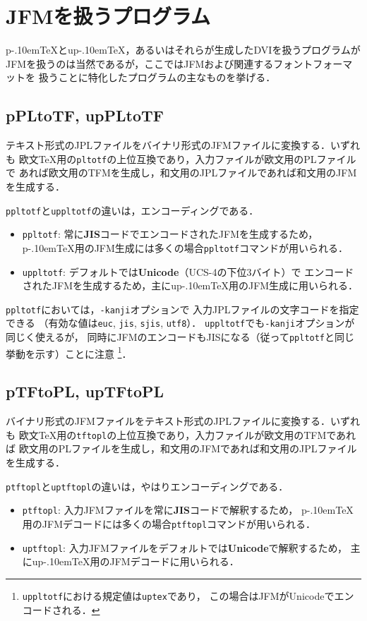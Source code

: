 \documentclass[a4paper,11pt,nomag]{jsarticle}
\def\code#1{\texttt{#1}}
\def\pTeX{p\kern-.10em\TeX}\def\upTeX{u\pTeX}
\begin{document}
\section{JFMを扱うプログラム}\label{jfm-program}

\pTeX と\upTeX ，あるいはそれらが生成したDVIを扱うプログラムが
JFMを扱うのは当然であるが，ここではJFMおよび関連するフォントフォーマットを
扱うことに特化したプログラムの主なものを挙げる．

\subsection{pPLtoTF, upPLtoTF}

テキスト形式のJPLファイルをバイナリ形式のJFMファイルに変換する．いずれも
欧文\TeX 用の\code{pltotf}の上位互換であり，入力ファイルが欧文用のPLファイルで
あれば欧文用のTFMを生成し，和文用のJPLファイルであれば和文用のJFMを生成する．

\code{ppltotf}と\code{uppltotf}の違いは，エンコーディングである．
\begin{itemize}
  \item \code{ppltotf}: 常に\textbf{JIS}コードでエンコードされたJFMを生成するため，
    \pTeX 用のJFM生成には多くの場合\code{ppltotf}コマンドが用いられる．
  \item \code{uppltotf}: デフォルトでは\textbf{Unicode}（UCS-4の下位3バイト）で
    エンコードされたJFMを生成するため，主に\upTeX 用のJFM生成に用いられる．
\end{itemize}

\code{ppltotf}においては，\code{-kanji}オプションで
入力JPLファイルの文字コードを指定できる
（有効な値は\code{euc}, \code{jis}, \code{sjis}, \code{utf8}）．
\code{uppltotf}でも\code{-kanji}オプションが同じく使えるが，
同時にJFMのエンコードもJISになる（従って\code{ppltotf}と同じ挙動を示す）ことに注意
\footnote{\code{uppltotf}における規定値は\code{uptex}であり，
この場合はJFMがUnicodeでエンコードされる．}．

\subsection{pTFtoPL, upTFtoPL}

バイナリ形式のJFMファイルをテキスト形式のJPLファイルに変換する．いずれも
欧文\TeX 用の\code{tftopl}の上位互換であり，入力ファイルが欧文用のTFMであれば
欧文用のPLファイルを生成し，和文用のJFMであれば和文用のJPLファイルを生成する．

\code{ptftopl}と\code{uptftopl}の違いは，やはりエンコーディングである．
\begin{itemize}
  \item \code{ptftopl}: 入力JFMファイルを常に\textbf{JIS}コードで解釈するため，
    \pTeX 用のJFMデコードには多くの場合\code{ptftopl}コマンドが用いられる．
  \item \code{uptftopl}: 入力JFMファイルをデフォルトでは\textbf{Unicode}で解釈するため，
    主に\upTeX 用のJFMデコードに用いられる．
\end{itemize}
\end{document}
